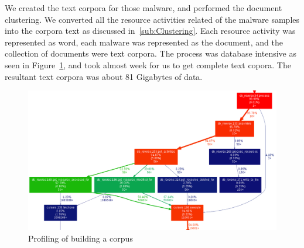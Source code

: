 We created the text corpora for those {\gettotalmalwareiii{}} malware, and performed the document clustering.
We converted all the resource activities related of the malware samples into the corpora text as discussed in~\autoref{sub:Clustering}.
Each resource activity was represented as word, each malware was represented as the document, and the collection of documents were text corpora.
The process was database intensive as seen in Figure~\ref{fig:actcreation}, and took almost week for us to get complete text copora.
The resultant text corpora was about 81 Gigabytes of data.
\begin{figure}
\begin{center}
  \includegraphics[scale=0.4]{figures/activities_creation.png}
\end{center}
\caption{Profiling of building a corpus}
\label{fig:actcreation}
\end{figure}
\\

